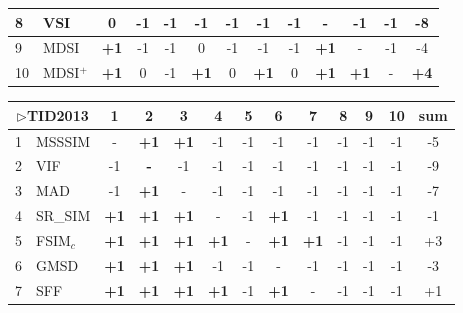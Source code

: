 \begin{table*}[htb]
{\begin{tabular}{|l|l|c|c|c|c|c|c|c|c|c|c||c|}
8         & VSI            & 0           & -1          & -1          & -1          & -1          & -1          & -1          & -           & -1          & -1          & -8          \\ \hline
9         & MDSI           & \textbf{+1} & -1          & -1          & 0           & -1          & -1          & -1          & \textbf{+1} & -           & -1          & -4          \\ \hline
10        & MDSI$^+$          & \textbf{+1} & 0           & -1          & \textbf{+1} & 0 & \textbf{+1} & 0           & \textbf{+1} & \textbf{+1} & -           & \textbf{+4} \\ \hline
\end{tabular}
\hspace*{2 mm}
\begin{tabular}{|l|l|c|c|c|c|c|c|c|c|c|c||c|}
\hline
\multicolumn{2}{|c|}{$\rhd$TID2013} & 1           & 2           & 3           & 4           & 5           & 6           & 7           & 8           & 9           & 10 & sum         \\ \hline
1         & MSSSIM         & -           & \textbf{+1} & \textbf{+1} & -1          & -1          & -1          & -1          & -1          & -1          & -1 & -5          \\ \hline
2         & VIF            & -1          & \textbf{-}  & -1          & -1          & -1          & -1          & -1          & -1          & -1          & -1 & -9          \\ \hline
3         & MAD            & -1          & \textbf{+1} & -           & -1          & -1          & -1          & -1          & -1          & -1          & -1 & -7          \\ \hline
4         & SR\_SIM        & \textbf{+1} & \textbf{+1} & \textbf{+1} & -           & -1          & \textbf{+1} & -1          & -1          & -1          & -1 & -1          \\ \hline
5         & FSIM$_c$          & \textbf{+1} & \textbf{+1} & \textbf{+1} & \textbf{+1} & -           & \textbf{+1} & \textbf{+1} & -1          & -1          & -1 & +3          \\ \hline
6         & GMSD           & \textbf{+1} & \textbf{+1} & \textbf{+1} & -1          & -1          & -           & -1          & -1          & -1          & -1 & -3          \\ \hline
7         & SFF            & \textbf{+1} & \textbf{+1} & \textbf{+1} & \textbf{+1} & -1          & \textbf{+1} & -           & -1          & -1          & -1 & +1          \\ \hline

\end{tabular}}
\end{table*}
